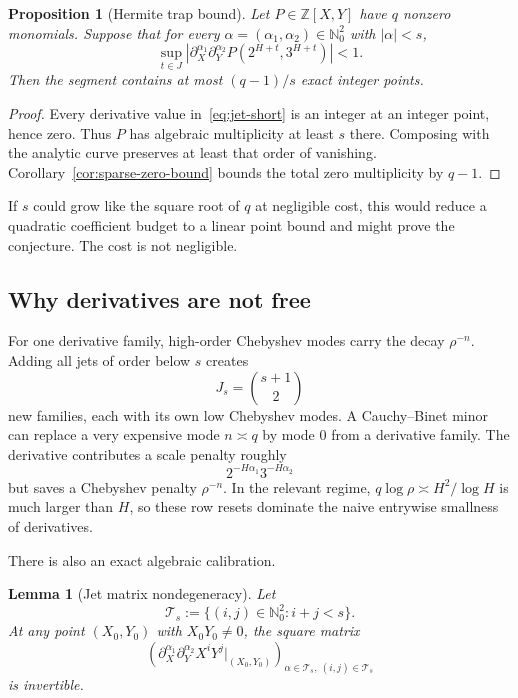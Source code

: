 \documentclass[11pt,oneside]{article}
\newtheorem{proposition}[theorem]{Proposition}
\newtheorem{lemma}[theorem]{Lemma}
\theoremstyle{definition}
\theoremstyle{remark}
\newcommand{\Nzero}{\mathbb N_0}
\newcommand{\Z}{\mathbb Z}
\begin{document}
\begin{proposition}[Hermite trap bound]
\label{prop:hermite-trap}
Let $P\in\Z[X,Y]$ have $q$ nonzero monomials.  Suppose that for every
$\alpha=(\alpha_1,\alpha_2)\in\Nzero^2$ with $|\alpha|<s$,
\begin{equation}
 \sup_{t\in J}
 \left|\partial_X^{\alpha_1}\partial_Y^{\alpha_2}
 P(2^{H+t},3^{H+t})\right|<1.
 \label{eq:jet-short}
\end{equation}
Then the segment contains at most $(q-1)/s$ exact integer points.
\end{proposition}

\begin{proof}
Every derivative value in~\eqref{eq:jet-short} is an integer at an integer point, hence zero.
Thus $P$ has algebraic multiplicity at least $s$ there.  Composing with the analytic curve
preserves at least that order of vanishing.  Corollary~\ref{cor:sparse-zero-bound} bounds the
total zero multiplicity by $q-1$.
\end{proof}

If $s$ could grow like the square root of $q$ at negligible cost, this would reduce a quadratic
coefficient budget to a linear point bound and might prove the conjecture.  The cost is not
negligible.

\subsection{Why derivatives are not free}

For one derivative family, high-order Chebyshev modes carry the decay $\rho^{-n}$.  Adding all
jets of order below $s$ creates
\[
 J_s=\binom{s+1}{2}
\]
new families, each with its own low Chebyshev modes.  A Cauchy--Binet minor can replace a very
expensive mode $n\asymp q$ by mode $0$ from a derivative family.  The derivative contributes a
scale penalty roughly
\[
 2^{-H\alpha_1}3^{-H\alpha_2}
\]
but saves a Chebyshev penalty $\rho^{-n}$.  In the relevant regime,
$q\log\rho\asymp H^2/\log H$ is much larger than $H$, so these row resets dominate the naive
entrywise smallness of derivatives.

There is also an exact algebraic calibration.

\begin{lemma}[Jet matrix nondegeneracy]
\label{lem:jet-matrix}
Let
\[
 \mathcal T_s:=\{(i,j)\in\Nzero^2:i+j<s\}.
\]
At any point $(X_0,Y_0)$ with $X_0Y_0\ne0$, the square matrix
\[
 \left(\partial_X^{\alpha_1}\partial_Y^{\alpha_2}X^iY^j
       \big|_{(X_0,Y_0)}\right)_{
       \alpha\in\mathcal T_s,\ (i,j)\in\mathcal T_s}
\]
is invertible.
\end{lemma}
\end{document}
